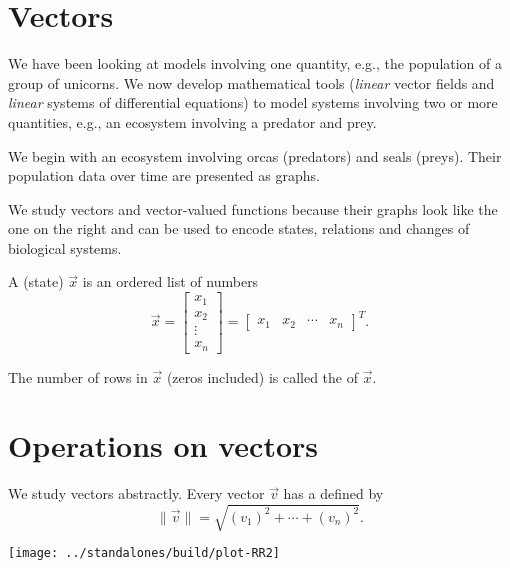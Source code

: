 \documentclass[../main.tex]{subfiles}
\begin{document}
 
\section{Vectors}

We have been looking at models involving one quantity, e.g., the population of a group of unicorns.  We now develop mathematical tools (\emph{linear} vector fields and \emph{linear} systems of differential equations) to model systems involving two or more quantities, e.g., an ecosystem involving a predator and prey.

\begin{example}
  We begin with an ecosystem involving orcas (predators) and seals (preys). Their population data over time are presented as graphs.

\end{example}

\vfill{}

We study vectors and vector-valued functions because their graphs look like the one on the right and can be used to encode states, relations and changes of biological systems.

\begin{definition}[vectors]
  A (state)  \(\vec{x}\) is an ordered list of numbers
  \[
    \vec{x} = 
    \begin{bmatrix}
      x_{1} \\ x_{2} \\ \vdots \\ x_{n}
    \end{bmatrix}
    = 
    \begin{bmatrix}
      x_{1} & x_{2} & \cdots & x_{n}
    \end{bmatrix}^{T}.
  \]

  The number of rows in \(\vec{x}\) (zeros included) is called the  of \(\vec{x}\).   
\end{definition}
\clearpage

\section{Operations on vectors}

We study vectors abstractly. Every vector \(\vec{v}\) has a  defined by 
\begin{equation}
  \| \vec{v} \| = \sqrt{ (v_{1})^{2} + \cdots + (v_{n})^{2} }.
\end{equation}

\texttt{[image: ../standalones/build/plot-RR2]}
\end{document}
